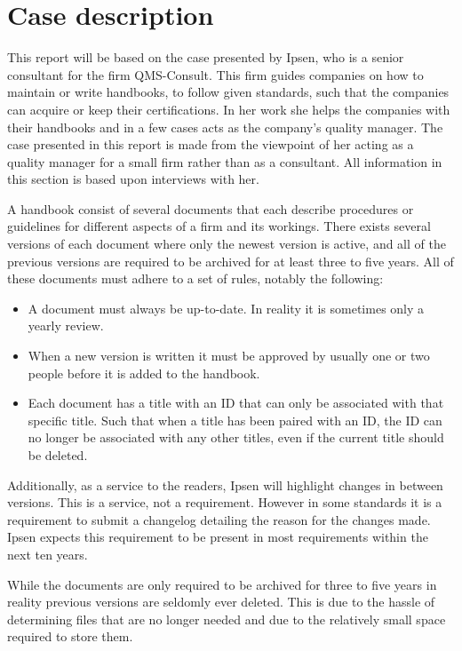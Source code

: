 \section{Case description} \label{sec:CaseDescription}

This report will be based on the case presented by Ipsen, who is a senior consultant for the firm QMS-Consult.
This firm guides companies on how to maintain or write handbooks, to follow given standards, such that the companies can acquire or keep their certifications.
In her work she helps the companies with their handbooks and in a few cases acts as the company's quality manager.
The case presented in this report is made from the viewpoint of her acting as a quality manager for a small firm rather than as a consultant.
All information in this section is based upon interviews with her.

A handbook consist of several documents that each describe procedures or guidelines for different aspects of a firm and its workings.
There exists several versions of each document where only the newest version is active, and all of the previous versions are required to be archived for at least three to five years. All of these documents must adhere to a set of rules, notably the following:

\begin{itemize}
	\item
	A document must always be up-to-date.
	In reality it is sometimes only a yearly review.
	\item
	When a new version is written it must be approved by usually one or two people before it is added to the handbook.
	\item
	Each document has a title with an ID that can only be associated with that specific title.
	Such that when a title has been paired with an ID, the ID can no longer be associated with any other titles, even if the current title should be deleted.
\end{itemize}

Additionally, as a service to the readers, Ipsen will highlight changes in between versions.
This is a service, not a requirement.
However in some standards it is a requirement to submit a changelog detailing the reason for the changes made.
Ipsen expects this requirement to be present in most requirements within the next ten years.

While the documents are only required to be archived for three to five years in reality previous versions are seldomly ever deleted.
This is due to the hassle of determining files that are no longer needed and due to the relatively small space required to store them.

